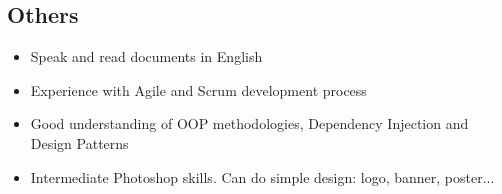 \begin{cventries}
\begin{row}[cellsep=0.75cm]{1}{1}
    \begin{cell}{1}
	\section*{Others}
	\vspace{-1.5ex}
    \begin{itemize} 
        \item {Speak and read documents in English}
        \item {Experience with Agile and Scrum development process}
        \item {Good understanding of OOP methodologies, Dependency Injection and Design Patterns}
        \item {Intermediate Photoshop skills. Can do simple design: logo, banner, poster...}
    \end{itemize}
	\end{cell}
\end{row}








\end{cventries}
